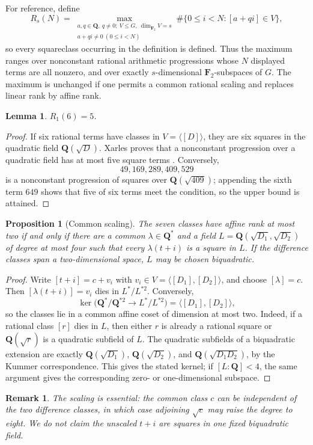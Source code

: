 \documentclass[11pt]{article}
\newtheorem{proposition}[theorem]{Proposition}
\newtheorem{lemma}[theorem]{Lemma}
\newtheorem{remark}[theorem]{Remark}
\newcommand{\Q}{\mathbf Q}
\newcommand{\F}{\mathbf F}
\begin{document}
For reference, define
\[
 R_s(N)=\max_{\substack{a,q\in\Q,\ q\ne0;\ V\leq G,\ \dim_{\F_2}V=s\\
                         a+qi\ne0\ (0\leq i<N)}}
             \#\{0\leq i<N:[a+qi]\in V\},
\]
so every squareclass occurring in the definition is defined.  Thus the
maximum ranges over nonconstant rational arithmetic progressions whose
$N$ displayed terms are all nonzero, and over exactly $s$-dimensional
$\F_2$-subspaces of $G$.  The maximum is unchanged if one permits a common
rational scaling and replaces linear rank by affine rank.

\begin{lemma}\label{lem:R16}
$R_1(6)=5$.
\end{lemma}
\begin{proof}
If six rational terms have classes in $V=\langle[D]\rangle$, they are six
squares in the quadratic field $\Q(\sqrt D)$.  Xarles proves that a
nonconstant progression over a quadratic field has at most five square
terms \cite[Section~4]{XarlesNF}.  Conversely,
\[
49,169,289,409,529
\]
is a nonconstant progression of squares over $\Q(\sqrt{409})$; appending
the sixth term $649$ shows that five of six terms meet the condition, so
the upper bound is attained.
\end{proof}

\begin{proposition}[Common scaling]\label{prop:scaling}
The seven classes have affine rank at most two if and only if there are a
common $\lambda\in\Q^*$ and a field
$L=\Q(\sqrt{D_1},\sqrt{D_2})$ of degree at most four such that every
$\lambda(t+i)$ is a square in $L$. If the difference classes span a
two-dimensional space, $L$ may be chosen biquadratic.
\end{proposition}
\begin{proof}
Write $[t+i]=c+v_i$ with $v_i\in
V=\langle[D_1],[D_2]\rangle$, and choose $[\lambda]=c$.
Then $[\lambda(t+i)]=v_i$ dies in $L^*/L^{*2}$. Conversely,
\[
 \ker\bigl(\Q^*/\Q^{*2}\longrightarrow L^*/L^{*2}\bigr)
 =\langle[D_1],[D_2]\rangle ,
\]
so the classes lie in a common affine coset of dimension at most two.
Indeed, if a rational class $[r]$ dies in $L$, then either $r$ is already
a rational square or $\Q(\sqrt r)$ is a quadratic subfield of $L$.
The quadratic subfields of a biquadratic extension are exactly
$\Q(\sqrt{D_1})$, $\Q(\sqrt{D_2})$, and
$\Q(\sqrt{D_1D_2})$, by the Kummer correspondence.  This gives the stated
kernel; if $[L:\Q]<4$, the same argument gives the corresponding
zero- or one-dimensional subspace.
\end{proof}
\begin{remark}
The scaling is essential: the common class $c$ can be independent of the
two difference classes, in which case adjoining $\sqrt c$ may raise the
degree to eight. We do not claim the unscaled $t+i$ are squares in one
fixed biquadratic field.
\end{remark}
\end{document}
